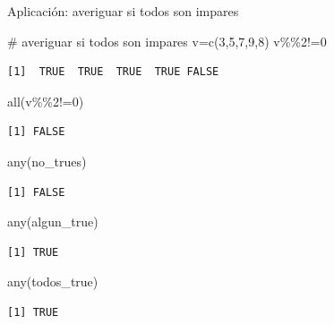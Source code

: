 \documentclass[
  ignorenonframetext,
  aspectratio=169,
  spanish,
]{beamer}
\newenvironment{Shaded}{\begin{snugshade}}{\end{snugshade}}
\newcommand{\CommentTok}[1]{\textcolor[rgb]{0.37,0.37,0.37}{#1}}
\newcommand{\DecValTok}[1]{\textcolor[rgb]{0.68,0.00,0.00}{#1}}
\newcommand{\FunctionTok}[1]{\textcolor[rgb]{0.28,0.35,0.67}{#1}}
\newcommand{\NormalTok}[1]{\textcolor[rgb]{0.00,0.23,0.31}{#1}}
\newcommand{\OtherTok}[1]{\textcolor[rgb]{0.00,0.23,0.31}{#1}}
\newcommand{\SpecialCharTok}[1]{\textcolor[rgb]{0.37,0.37,0.37}{#1}}
\begin{document}
\begin{frame}[fragile]{Aplicación: averiguar si todos son impares}
\label{aplicaciuxf3n-averiguar-si-todos-son-impares}
\begin{Shaded}
\begin{Highlighting}[]
\CommentTok{\# averiguar si todos son impares }
\NormalTok{v}\OtherTok{=}\FunctionTok{c}\NormalTok{(}\DecValTok{3}\NormalTok{,}\DecValTok{5}\NormalTok{,}\DecValTok{7}\NormalTok{,}\DecValTok{9}\NormalTok{,}\DecValTok{8}\NormalTok{) }
\NormalTok{v}\SpecialCharTok{\%\%}\DecValTok{2}\SpecialCharTok{!=}\DecValTok{0} 
\end{Highlighting}
\end{Shaded}

\begin{verbatim}
[1]  TRUE  TRUE  TRUE  TRUE FALSE
\end{verbatim}

\begin{Shaded}
\begin{Highlighting}[]
\FunctionTok{all}\NormalTok{(v}\SpecialCharTok{\%\%}\DecValTok{2}\SpecialCharTok{!=}\DecValTok{0}\NormalTok{) }
\end{Highlighting}
\end{Shaded}

\begin{verbatim}
[1] FALSE
\end{verbatim}

\begin{Shaded}
\begin{Highlighting}[]
\FunctionTok{any}\NormalTok{(no\_trues)}
\end{Highlighting}
\end{Shaded}

\begin{verbatim}
[1] FALSE
\end{verbatim}

\begin{Shaded}
\begin{Highlighting}[]
\FunctionTok{any}\NormalTok{(algun\_true)}
\end{Highlighting}
\end{Shaded}

\begin{verbatim}
[1] TRUE
\end{verbatim}

\begin{Shaded}
\begin{Highlighting}[]
\FunctionTok{any}\NormalTok{(todos\_true)}
\end{Highlighting}
\end{Shaded}

\begin{verbatim}
[1] TRUE
\end{verbatim}
\end{frame}
\end{document}

